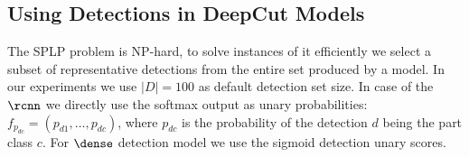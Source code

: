 \subsection{Using Detections in DeepCut Models}
\label{sec:unary-prob}
The SPLP problem is NP-hard, to solve instances of it efficiently we
select a subset of representative detections from the entire set
produced by a model.
In our experiments we use $|D|= 100$ as default detection set size.
In case of the $\rcnn$ we directly use the softmax output as unary
probabilities: $f_{p_{dc}} = (p_{d1},\ldots,p_{dc})$, where $p_{dc}$
is the probability of the detection $d$ being the part class $c$. For
$\dense$ detection model we use the sigmoid detection unary scores.
